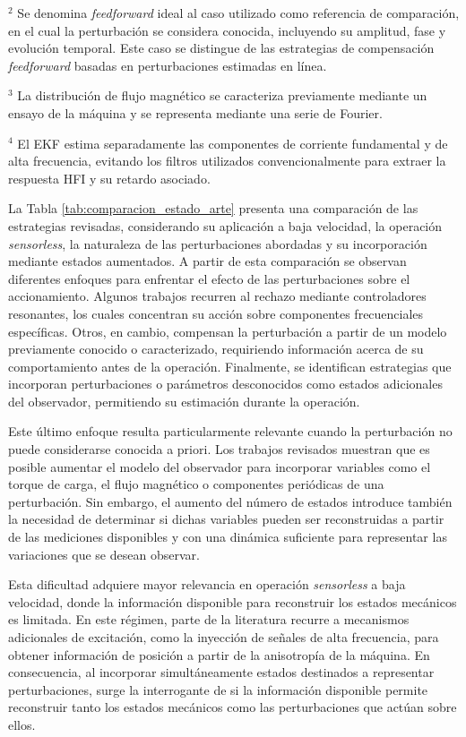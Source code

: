 \begin{table}[htbp]
\begin{minipage}{0.95\textwidth}
        $^{2}$ Se denomina \textit{feedforward} ideal al caso utilizado como referencia de comparación, en el cual la perturbación se considera conocida, incluyendo su amplitud, fase y evolución temporal. Este caso se distingue de las estrategias de compensación \textit{feedforward} basadas en perturbaciones estimadas en línea.
        
        $^{3}$ La distribución de flujo magnético se caracteriza previamente mediante un ensayo de la máquina y se representa mediante una serie de Fourier.
        
        $^{4}$ El EKF estima separadamente las componentes de corriente fundamental y de alta frecuencia, evitando los filtros utilizados convencionalmente para extraer la respuesta HFI y su retardo asociado.
      
    \end{minipage}
\end{table}

La Tabla \ref{tab:comparacion_estado_arte} presenta una comparación de las estrategias revisadas, considerando su aplicación a baja velocidad, la operación \textit{sensorless}, la naturaleza de las perturbaciones abordadas y su incorporación mediante estados aumentados. A partir de esta comparación se observan diferentes enfoques para enfrentar el efecto de las perturbaciones sobre el accionamiento. Algunos trabajos recurren al rechazo mediante controladores resonantes, los cuales concentran su acción sobre componentes frecuenciales específicas. Otros, en cambio, compensan la perturbación a partir de un modelo previamente conocido o caracterizado, requiriendo información acerca de su comportamiento antes de la operación. Finalmente, se identifican estrategias que incorporan perturbaciones o parámetros desconocidos como estados adicionales del observador, permitiendo su estimación durante la operación.

Este último enfoque resulta particularmente relevante cuando la perturbación no puede considerarse conocida a priori. Los trabajos revisados muestran que es posible aumentar el modelo del observador para incorporar variables como el torque de carga, el flujo magnético o componentes periódicas de una perturbación. Sin embargo, el aumento del número de estados introduce también la necesidad de determinar si dichas variables pueden ser reconstruidas a partir de las mediciones disponibles y con una dinámica suficiente para representar las variaciones que se desean observar.

Esta dificultad adquiere mayor relevancia en operación \textit{sensorless} a baja velocidad, donde la información disponible para reconstruir los estados mecánicos es limitada. En este régimen, parte de la literatura recurre a mecanismos adicionales de excitación, como la inyección de señales de alta frecuencia, para obtener información de posición a partir de la anisotropía de la máquina. En consecuencia, al incorporar simultáneamente estados destinados a representar perturbaciones, surge la interrogante de si la información disponible permite reconstruir tanto los estados mecánicos como las perturbaciones que actúan sobre ellos.

